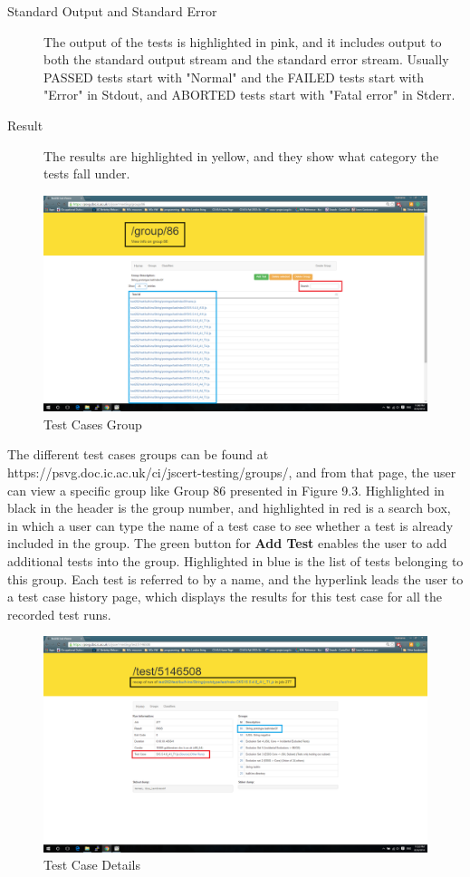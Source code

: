\documentclass[a4paper,11pt,twoside]{report}
\begin{document}
\begin{description}
\item[Standard Output and Standard Error] The output of the tests is highlighted in pink, and it includes output to both the standard output stream and the standard error stream. Usually PASSED tests start with "Normal" and the FAILED tests start with "Error" in Stdout, and ABORTED tests start with "Fatal error" in Stderr.

\item[Result] The results are highlighted in yellow, and they show what category the tests fall under.
\end{description} 

\begin{figure}[h!]
  \caption{Test Cases Group}
  \includegraphics[width=1.0\textwidth]{group_testing_screen_boxed}
\end{figure}

The different test cases groups can be found at https://psvg.doc.ic.ac.uk/ci/jscert-testing/groups/, and from that page, the user can view a specific group like Group 86 presented in Figure 9.3. Highlighted in black in the header is the group number, and highlighted in red is a search box, in which a user can type the name of a test case to see whether a test is already included in the group. The green button for \textbf{Add Test} enables the user to add additional tests into the group. Highlighted in blue is the list of tests belonging to this group. Each test is referred to by a name, and the hyperlink leads the user to a test case history page, which displays the results for this test case for all the recorded test runs. 

\begin{figure}[h!]
  \caption{Test Case Details}
  \includegraphics[width=1.0\textwidth]{test_case_testing_screen_boxed}
\end{figure}
\end{document}
